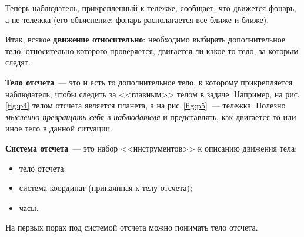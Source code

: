 \documentclass[main.tex]{subfiles}
\begin{document}

%     



Теперь наблюдатель, прикрепленный к тележке, сообщает, что движется фонарь, а не тележка (его объяснение: фонарь располагается все ближе и ближе). 

Итак, всякое \textbf{движение относительно}: необходимо выбирать дополнительное тело, относительно которого проверяется, двигается ли какое-то тело, за которым следят.

\textbf{Тело отсчета}~--- это и есть то дополнительное тело, к которому прикрепляется наблюдатель, чтобы следить за <<главным>> телом в задаче. Например, на рис.\,\ref{fig:p4} телом отсчета является планета, а на рис.\,\ref{fig:p5}~--- тележка. Полезно \emph{мысленно превращать себя в наблюдателя} и представлять, как двигается то или иное тело в данной ситуации.

\textbf{Система отсчета}~--- это набор <<инструментов>> к описанию движения тела:
\begin{itemize}
    \item тело отсчета;
    \item система координат (припаянная к телу отсчета);
    \item часы.
\end{itemize}

На первых порах под системой отсчета можно понимать тело отсчета.




 
\end{document}
